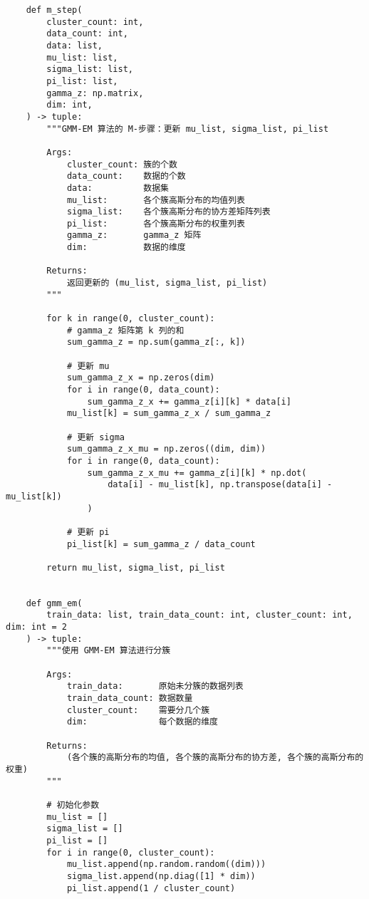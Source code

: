 \begin{verbatim}
    def m_step(
        cluster_count: int,
        data_count: int,
        data: list,
        mu_list: list,
        sigma_list: list,
        pi_list: list,
        gamma_z: np.matrix,
        dim: int,
    ) -> tuple:
        """GMM-EM 算法的 M-步骤：更新 mu_list, sigma_list, pi_list

        Args:
            cluster_count: 簇的个数
            data_count:    数据的个数
            data:          数据集
            mu_list:       各个簇高斯分布的均值列表
            sigma_list:    各个簇高斯分布的协方差矩阵列表
            pi_list:       各个簇高斯分布的权重列表
            gamma_z:       gamma_z 矩阵
            dim:           数据的维度

        Returns:
            返回更新的 (mu_list, sigma_list, pi_list)
        """

        for k in range(0, cluster_count):
            # gamma_z 矩阵第 k 列的和
            sum_gamma_z = np.sum(gamma_z[:, k])

            # 更新 mu
            sum_gamma_z_x = np.zeros(dim)
            for i in range(0, data_count):
                sum_gamma_z_x += gamma_z[i][k] * data[i]
            mu_list[k] = sum_gamma_z_x / sum_gamma_z

            # 更新 sigma
            sum_gamma_z_x_mu = np.zeros((dim, dim))
            for i in range(0, data_count):
                sum_gamma_z_x_mu += gamma_z[i][k] * np.dot(
                    data[i] - mu_list[k], np.transpose(data[i] - mu_list[k])
                )

            # 更新 pi
            pi_list[k] = sum_gamma_z / data_count

        return mu_list, sigma_list, pi_list


    def gmm_em(
        train_data: list, train_data_count: int, cluster_count: int, dim: int = 2
    ) -> tuple:
        """使用 GMM-EM 算法进行分簇

        Args:
            train_data:       原始未分簇的数据列表
            train_data_count: 数据数量
            cluster_count:    需要分几个簇
            dim:              每个数据的维度

        Returns:
            (各个簇的高斯分布的均值, 各个簇的高斯分布的协方差, 各个簇的高斯分布的权重)
        """

        # 初始化参数
        mu_list = []
        sigma_list = []
        pi_list = []
        for i in range(0, cluster_count):
            mu_list.append(np.random.random((dim)))
            sigma_list.append(np.diag([1] * dim))
            pi_list.append(1 / cluster_count)


\end{verbatim}
